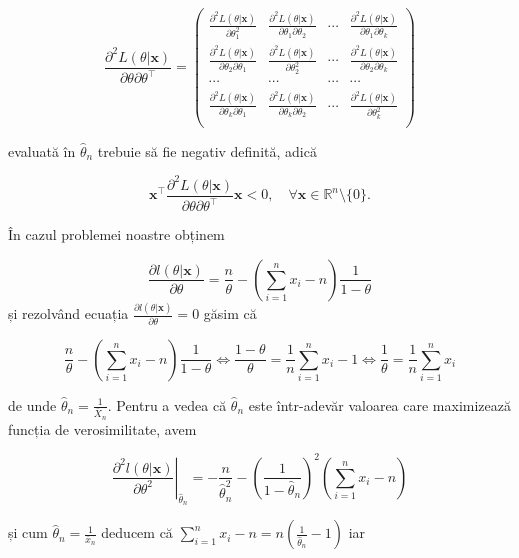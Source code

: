 \documentclass[]{article}
\begin{document}
\[
  \frac{\partial^2 L(\theta|\mathbf{x})}{\partial\theta \partial\theta^\intercal} = \begin{pmatrix}
              \frac{\partial^2 L(\theta|\mathbf{x})}{\partial\theta_1^2} & \frac{\partial^2 L(\theta|\mathbf{x})}{\partial\theta_1\partial\theta_2} & \cdots & \frac{\partial^2 L(\theta|\mathbf{x})}{\partial\theta_1\partial\theta_k}\\
              \frac{\partial^2 L(\theta|\mathbf{x})}{\partial\theta_2\partial\theta_1} & \frac{\partial^2 L(\theta|\mathbf{x})}{\partial\theta_2^2} & \cdots & \frac{\partial^2 L(\theta|\mathbf{x})}{\partial\theta_2\partial\theta_k}\\
              \cdots & \cdots & \cdots & \cdots \\
              \frac{\partial^2 L(\theta|\mathbf{x})}{\partial\theta_k\partial\theta_1} & \frac{\partial^2 L(\theta|\mathbf{x})}{\partial\theta_k\partial\theta_2} & \cdots & \frac{\partial^2 L(\theta|\mathbf{x})}{\partial\theta_k^2}\\
              \end{pmatrix}
\]

evaluată în \(\hat{\theta}_n\) trebuie să fie negativ definită, adică

\[
  \mathbf{x}^\intercal\frac{\partial^2 L(\theta|\mathbf{x})}{\partial\theta \partial\theta^\intercal}\mathbf{x}<0, \quad \forall \mathbf{x}\in\mathbb{R}^n  \setminus\{0\}.
\]

În cazul problemei noastre obținem

\[
  \frac{\partial l(\theta|\mathbf{x})}{\partial\theta} = \frac{n}{\theta} - \left(\sum_{i=1}^n x_i - n\right)\frac{1}{1-\theta}
\] și rezolvând ecuația
\(\frac{\partial l(\theta|\mathbf{x})}{\partial\theta} = 0\) găsim că

\[
  \frac{n}{\theta} - \left(\sum_{i=1}^n x_i - n\right)\frac{1}{1-\theta} \iff \frac{1-\theta}{\theta} = \frac{1}{n}\sum_{i=1}^n x_i - 1 \iff \frac{1}{\theta} = \frac{1}{n}\sum_{i=1}^n x_i
\]

de unde \(\hat{\theta}_n = \frac{1}{\bar{X}_n}\). Pentru a vedea că
\(\hat{\theta}_n\) este într-adevăr valoarea care maximizează funcția de
verosimilitate, avem

\[
  \left. \frac{\partial^2 l(\theta|\mathbf{x})}{\partial\theta^2}\right\vert_{\hat{\theta}_n} = -\frac{n}{\hat{\theta}_n^2} - \left(\frac{1}{1-\hat{\theta}_n}\right)^2\left(\sum_{i=1}^n x_i - n\right)
\]

și cum \(\hat{\theta}_n = \frac{1}{\bar{x}_n}\) deducem că
\(\sum_{i=1}^n x_i - n = n\left(\frac{1}{\hat{\theta}_n} - 1\right)\)
iar
\end{document}
